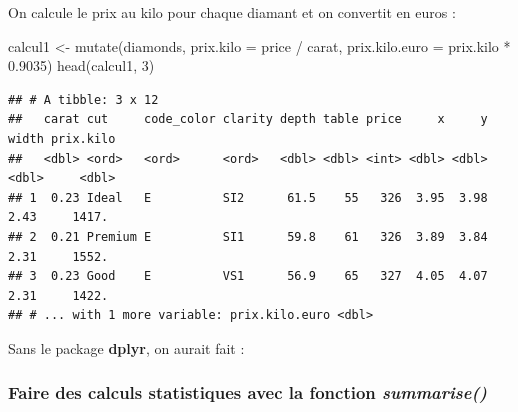 \documentclass[
]{book}
\newenvironment{Shaded}{\begin{snugshade}}{\end{snugshade}}
\newcommand{\AttributeTok}[1]{\textcolor[rgb]{0.77,0.63,0.00}{#1}}
\newcommand{\DecValTok}[1]{\textcolor[rgb]{0.00,0.00,0.81}{#1}}
\newcommand{\FloatTok}[1]{\textcolor[rgb]{0.00,0.00,0.81}{#1}}
\newcommand{\FunctionTok}[1]{\textcolor[rgb]{0.00,0.00,0.00}{#1}}
\newcommand{\NormalTok}[1]{#1}
\newcommand{\OtherTok}[1]{\textcolor[rgb]{0.56,0.35,0.01}{#1}}
\newcommand{\SpecialCharTok}[1]{\textcolor[rgb]{0.00,0.00,0.00}{#1}}
\theoremstyle{definition}
\theoremstyle{definition}
\theoremstyle{definition}
\theoremstyle{definition}
\theoremstyle{remark}
\begin{document}
On calcule le prix au kilo pour chaque diamant et on convertit en euros :

\begin{Shaded}
\begin{Highlighting}[]
\NormalTok{calcul1 }\OtherTok{\textless{}{-}} \FunctionTok{mutate}\NormalTok{(diamonds, }\AttributeTok{prix.kilo =}\NormalTok{ price }\SpecialCharTok{/}\NormalTok{ carat, }
                  \AttributeTok{prix.kilo.euro =}\NormalTok{ prix.kilo }\SpecialCharTok{*} \FloatTok{0.9035}\NormalTok{)}
\FunctionTok{head}\NormalTok{(calcul1, }\DecValTok{3}\NormalTok{)}
\end{Highlighting}
\end{Shaded}

\begin{verbatim}
## # A tibble: 3 x 12
##   carat cut     code_color clarity depth table price     x     y width prix.kilo
##   <dbl> <ord>   <ord>      <ord>   <dbl> <dbl> <int> <dbl> <dbl> <dbl>     <dbl>
## 1  0.23 Ideal   E          SI2      61.5    55   326  3.95  3.98  2.43     1417.
## 2  0.21 Premium E          SI1      59.8    61   326  3.89  3.84  2.31     1552.
## 3  0.23 Good    E          VS1      56.9    65   327  4.05  4.07  2.31     1422.
## # ... with 1 more variable: prix.kilo.euro <dbl>
\end{verbatim}

Sans le package \textbf{dplyr}, on aurait fait :

\begin{Shaded}
\end{Shaded}

\hypertarget{faire-des-calculs-statistiques-avec-la-fonction-summarise}{%
\subsubsection{\texorpdfstring{Faire des calculs statistiques avec la fonction \emph{summarise()}}{Faire des calculs statistiques avec la fonction summarise()}}\label{faire-des-calculs-statistiques-avec-la-fonction-summarise}}
\end{document}
